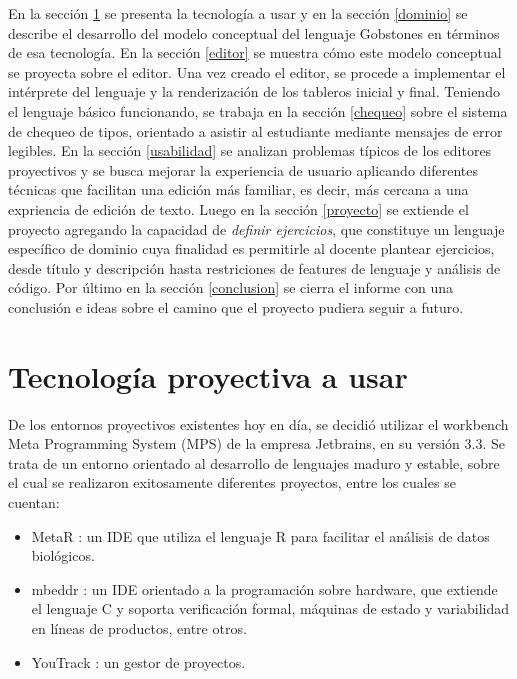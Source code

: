 En la sección \ref{tecnologias} se presenta la tecnología a usar y en la sección \ref{dominio} se describe el desarrollo del modelo conceptual del lenguaje Gobstones en términos de esa tecnología. En la sección \ref{editor} se muestra cómo este modelo conceptual se proyecta sobre el editor. Una vez creado el editor, se procede a implementar el intérprete del lenguaje y la renderización de los tableros inicial y final. Teniendo el lenguaje básico funcionando, se trabaja en la sección \ref{chequeo} sobre el sistema de chequeo de tipos, orientado a asistir al estudiante mediante mensajes de error legibles. En la sección \ref{usabilidad} se analizan problemas típicos de los editores proyectivos y se busca mejorar la experiencia de usuario aplicando diferentes técnicas que facilitan una edición más familiar, es decir, más cercana a una expriencia de edición de texto. Luego en la sección \ref{proyecto} se extiende el proyecto agregando la capacidad de \textit{definir ejercicios}, que constituye un lenguaje específico de dominio cuya finalidad es permitirle al docente plantear ejercicios, desde título y descripción hasta restriciones de features de lenguaje y análisis de código. Por último en la sección \ref{conclusion} se cierra el informe con una conclusión e ideas sobre el camino que el proyecto pudiera seguir a futuro.

\section{Tecnología proyectiva a usar}\label{tecnologias}

De los entornos proyectivos existentes hoy en día, se decidió utilizar el workbench Meta Programming System (MPS) \cite{MPS} de la empresa Jetbrains, en su versión 3.3.
Se trata de un entorno orientado al desarrollo de lenguajes maduro y estable, sobre el cual se realizaron exitosamente diferentes proyectos, entre los cuales se cuentan:
\begin{itemize}
\item MetaR \cite{MetaR}: un IDE que utiliza el lenguaje R para facilitar el análisis de datos biológicos.
\item mbeddr \cite{mbeddr}: un IDE orientado a la programación sobre hardware, que extiende el lenguaje C y soporta verificación formal, máquinas de estado y variabilidad en líneas de productos, entre otros.
\item YouTrack \cite{YouTrack}: un gestor de proyectos.
\end{itemize}

